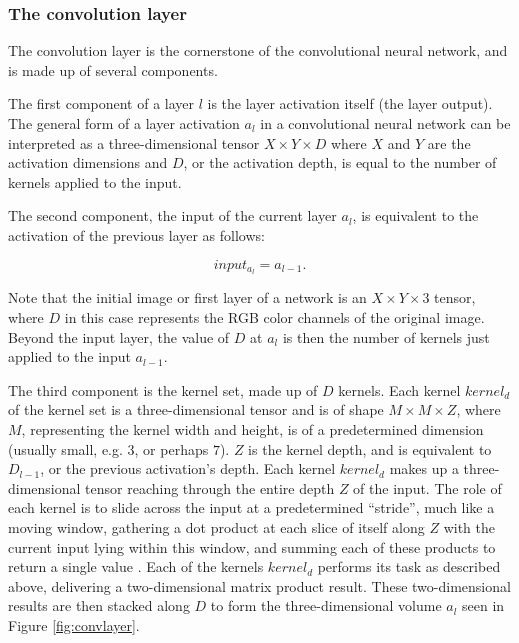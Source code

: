 \subsubsection{The convolution layer}
The convolution layer is the cornerstone of the convolutional neural network, and is made up of several components.

The first component of a layer $l$ is the layer activation itself (the layer output). The general form of a layer activation $a_{l}$ in a convolutional neural network can be interpreted as a three-dimensional tensor $X\times Y\times D$ where $X$ and $Y$ are the activation dimensions and $D$, or the activation depth, is equal to the number of kernels applied to the input. 

The second component, the input of the current layer $a_{l}$, is equivalent to the activation of the previous layer as follows:

\begin{equation}
\label{eqn:forward}
input_{a_{l}} = a_{l-1}.
\end{equation}

Note that the initial image or first layer of a network is an $X\times Y\times 3$ tensor, where $D$ in this case represents the RGB color channels of the original image. Beyond the input layer, the value of $D$ at $a_{l}$ is then the number of kernels just applied to the input $a_{l-1}$.

The third component is the kernel set, made up of $D$ kernels. Each kernel $kernel_d$ of the kernel set is a three-dimensional tensor and is of shape $M\times M\times Z$, where $M$, representing the kernel width and height, is of a predetermined dimension (usually small, e.g. $3$, or perhaps $7$). $Z$ is the kernel depth, and is equivalent to $D_{l-1}$, or the previous activation's depth. Each kernel $kernel_d$ makes up a three-dimensional tensor reaching through the entire depth $Z$ of the input. The role of each kernel is to slide across the input at a predetermined ``stride'', much like a moving window, gathering a dot product at each slice of itself along $Z$ with the current input lying within this window, and summing each of these products to return a single value \cite{convnets}. Each of the kernels $kernel_d$ performs its task as described above, delivering a two-dimensional matrix product result. These two-dimensional results are then stacked along $D$ to form the three-dimensional volume $a_{l}$ seen in Figure \ref{fig:convlayer}.
																																
